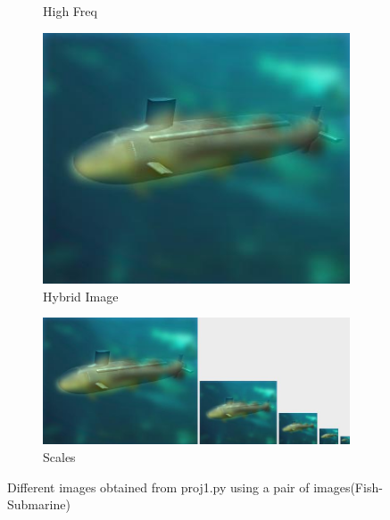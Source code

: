 \documentclass{bmvc2k}
\begin{document}
\begin{figure}[h!]
\begin{subfigure}[b]{0.2\linewidth}
    \caption{High Freq}
  \end{subfigure}
  \begin{subfigure}[b]{0.2\linewidth}
    \includegraphics[width=\linewidth]{images/Fish_Sub/hybrid_image_fish_submarine.jpg}
    \caption{Hybrid Image}
  \end{subfigure}
  \begin{subfigure}[b]{0.5\linewidth}
    \includegraphics[width=\linewidth]{images/Fish_Sub/hybrid_image_scales_fish_submarine.jpg}
    \caption{Scales}
  \end{subfigure}
  \caption{Different images obtained from proj1.py using a pair of images(Fish-Submarine)}
  \label{fig:coffee3}
\end{figure}
\end{document}
